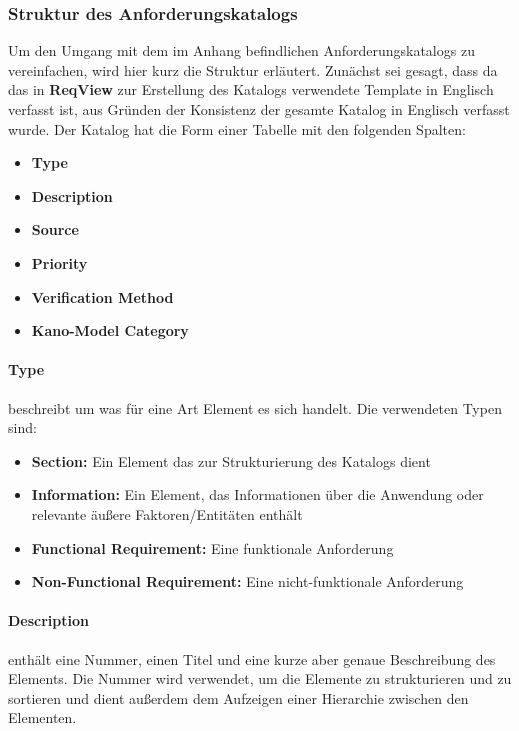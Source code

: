 \subsubsection{Struktur des Anforderungskatalogs}\label{subsubsec:structure}
Um den Umgang mit dem im Anhang befindlichen Anforderungskatalogs zu vereinfachen, wird hier kurz die Struktur erläutert.
Zunächst sei gesagt, dass da das in \textbf{ReqView} zur Erstellung des Katalogs verwendete Template in Englisch verfasst ist,
aus Gründen der Konsistenz der gesamte Katalog in Englisch verfasst wurde.
Der Katalog hat die Form einer Tabelle mit den folgenden Spalten:
\begin{itemize}
    \item \textbf{Type}
    \item \textbf{Description}
    \item \textbf{Source}
    \item \textbf{Priority}
    \item \textbf{Verification Method}
    \item \textbf{Kano-Model Category}
\end{itemize}

\paragraph{Type} beschreibt um was für eine Art Element es sich handelt.
Die verwendeten Typen sind:
\begin{itemize}
    \item \textbf{Section:} Ein Element das zur Strukturierung des Katalogs dient
    \item \textbf{Information:} Ein Element, das Informationen über die Anwendung oder relevante äußere Faktoren/Entitäten
    enthält
    \item \textbf{Functional Requirement:} Eine funktionale Anforderung
    \item \textbf{Non-Functional Requirement:} Eine nicht-funktionale Anforderung
\end{itemize}

\paragraph{Description} enthält eine Nummer, einen Titel und eine kurze aber genaue Beschreibung des Elements.
Die Nummer wird verwendet, um die Elemente zu strukturieren und zu sortieren und dient außerdem dem Aufzeigen einer Hierarchie
zwischen den Elementen.

